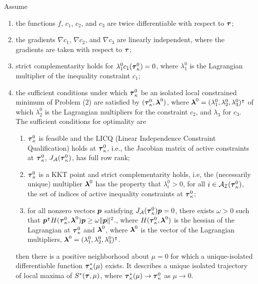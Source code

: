 \documentclass[../main.tex]{subfiles}
\begin{document}
\begin{lemma}
Assume
\begin{enumerate}
		\item the functions $f$, $c_1$, $c_2$, and $c_3$ are twice differentiable with respect to $\boldsymbol{\tau}$;
		\item the gradients $\nabla c_1$, $\nabla c_2$, and $\nabla c_3$ are linearly independent, where the gradients are taken with respect to $\boldsymbol{\tau}$;
		\item strict complementarity holds for  $\lambda_1^0 c_1(\boldsymbol{\tau}_{\kappa}^0) = 0$, where $\lambda_1^0$ is the Lagrangian multiplier of the inequality constraint $c_1$;
		\item the sufficient conditions under which $\boldsymbol{\tau}_{\kappa}^0$ be an isolated local constrained minimum of Problem (2) are satisfied by $(\boldsymbol{\tau}^0_{\kappa}, \boldsymbol{\lambda}^{0})$, where $\boldsymbol{\lambda}^0 = (\lambda_1^0, \lambda_2^0, \lambda_3^0)^\intercal $ of which $\lambda_2^0$ is the  Lagrangian multipliers for the  constraint $c_2$, and $\lambda_3$ for $c_3$. The sufficient conditions for optimality are
		\begin{enumerate}
			\item $\boldsymbol{\tau}_{\kappa}^0$ is feasible and the LICQ (Linear Independence Constraint Qualification) holds at $\boldsymbol{\tau}_{\kappa}^0$, i.e., the Jacobian matrix of active constraints at $\boldsymbol{\tau}_{\kappa}^0$, $J_{\mathcal{A}}(\boldsymbol{\tau}_{\kappa}^0)$, has full row rank;
			\item $\boldsymbol{\tau}_{\kappa}^0$ is a KKT point and strict complementarity holds, i.e, the (necessarily unique) multiplier $\boldsymbol{\lambda}^0$ has the property that $\lambda_i^0 > 0$, for all $i  \in \mathcal{A}_{\mathcal{I}}(\boldsymbol{\tau}_{\kappa}^0)$, the set of indices of active inequality constraints at $\boldsymbol{\tau}_{\kappa}^0$;
			\item for all nonzero vectors $\boldsymbol{p}$ satisfying $J_{\mathcal{A}}(\boldsymbol{\tau}_{\kappa}^0)\boldsymbol{p} = 0$, there exists $\omega > 0$ such that $\boldsymbol{p}^{\intercal}H(\boldsymbol{\tau}_{\kappa}^0, \boldsymbol{\lambda}^0) \boldsymbol{p} \ge \omega \|\boldsymbol{p}\|^2$., where $H(\boldsymbol{\tau}_{\kappa}^0, \boldsymbol{\lambda}^0) $ is the hessian of the Lagrangian at $\boldsymbol{\tau}_{\kappa}^0$ and $\boldsymbol{\lambda}^0$, where $\boldsymbol{\lambda}^0$ is the vector of the Lagrangian multipliers, $\boldsymbol{\lambda}^0 = (\lambda_1^0, \lambda_2^0, \lambda_3^0)^{\intercal}$.
		\end{enumerate} 
		then there is a positive neighborhood about $\mu = 0$ for which a unique-isolated differentiable function $\boldsymbol{\tau}^*_{\kappa}(\mu)$ exists. It describes a unique isolated trajectory of local maxima of $S^*(\boldsymbol{\tau}, \mu)$, where $\boldsymbol{\tau}^*_{\kappa}(\mu) \to \boldsymbol{\tau}^0_{\kappa}$ as $\mu \to 0$.
	\end{enumerate}
\end{lemma}
\end{document}
